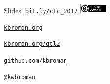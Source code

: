 \documentclass[12pt,t]{beamer}
\begin{document}
\begin{frame}[c]{}

\Large

Slides: \href{http://bit.ly/ctc_2017}{\tt bit.ly/ctc\_2017} \quad
\includegraphics[height=5mm]{Figs/cc-zero.png}

\vspace{7mm}

\href{http://kbroman.org}{\tt \lolit kbroman.org}

\vspace{7mm}

\href{http://kbroman.org/qtl2}{\tt kbroman.org/qtl2}

\vspace{7mm}

\href{https://github.com/kbroman}{\tt \lolit github.com/kbroman}

\vspace{7mm}

\href{https://twitter.com/kwbroman}{\tt \lolit @kwbroman}


\end{frame}
\end{document}
